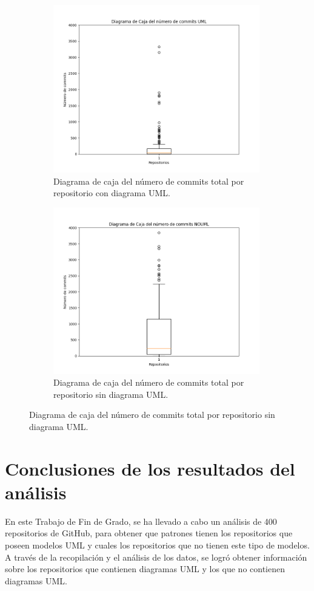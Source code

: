 \documentclass[a4paper, 12pt]{book}
\begin{document}
\begin{figure}
  \centering
  \begin{subfigure}{0.45\linewidth}
    \centering
    \includegraphics[width=9cm, keepaspectratio]{img/Figure_commitsUML.png}
    \caption{Diagrama de caja del número de commits total por repositorio con diagrama UML. }\label{fig:Figure_commitsUML}
  \end{subfigure}
  \hfill
    \begin{subfigure}{0.45\linewidth}
      \centering
      \includegraphics[width=9cm, keepaspectratio]{img/Figure_commitsNOUML.png}
      \caption{Diagrama de caja del número de commits total por repositorio sin diagrama UML.}\label{fig:Figure_commitsNOUML}
  \end{subfigure}
\end{figure}

\section{Conclusiones de los resultados del análisis}
\label{sec:conclusiones de los resultados del análisis}

En este Trabajo de Fin de Grado, se ha llevado a cabo un análisis de 400 repositorios de GitHub, para obtener que patrones tienen los repositorios que poseen modelos UML y cuales los repositorios que no tienen este tipo de modelos.
A través de la recopilación y el análisis de los datos, se logró obtener información sobre los repositorios que contienen diagramas UML y los que no contienen diagramas UML.
\end{document}
